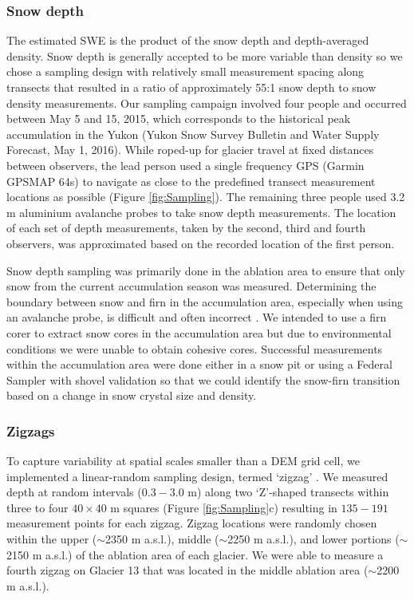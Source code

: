 \documentclass[review,oneside, letterpaper]{igs}
\begin{document}
\subsubsection{Snow depth}

The estimated SWE is the product of the snow depth and depth-averaged density. Snow depth is generally accepted to be more variable than density \citep{Elder1991, Clark2011, Lopez2013} so we chose a sampling design with relatively small measurement spacing along transects that resulted in a ratio of approximately 55:1 snow depth to snow density measurements. Our sampling campaign involved four people and occurred between May 5 and 15, 2015, which corresponds to the historical peak accumulation in the Yukon (Yukon Snow Survey Bulletin and Water Supply Forecast, May 1, 2016). While roped-up for glacier travel at fixed distances between observers, the lead person used a single frequency GPS (Garmin GPSMAP 64s) to navigate as close to the predefined transect measurement locations as possible (Figure \ref{fig:Sampling}). The remaining three people used 3.2 m aluminium avalanche probes to take snow depth measurements. The location of each set of depth measurements, taken by the second, third and fourth observers, was approximated based on the recorded location of the first person. 

Snow depth sampling was primarily done in the ablation area to ensure that only snow from the current accumulation season was measured. Determining the boundary between snow and firn in the accumulation area, especially when using an avalanche probe, is difficult and often incorrect \citep{Grunewald2010,Sold2013}. We intended to use a firn corer to extract snow cores in the accumulation area but due to environmental conditions we were unable to obtain cohesive cores. Successful measurements within the accumulation area were done either in a snow pit or using a Federal Sampler with shovel validation so that we could identify the snow-firn transition based on a change in snow crystal size and density. 

\subsubsection{Zigzags}

To capture variability at spatial scales smaller than a DEM grid cell, we implemented a linear-random sampling design, termed `zigzag' \citep{Shea2010}. We measured depth at random intervals ($0.3 - 3.0$ m) along two `Z'-shaped transects within three to four $40\times40$ m squares (Figure \ref{fig:Sampling}c) resulting in $135-191$ measurement points for each zigzag. Zigzag locations were randomly chosen within the upper ($\sim$2350 m a.s.l.), middle ($\sim$2250 m a.s.l.), and lower portions ($\sim$2150 m a.s.l.) of the ablation area of each glacier. We were able to measure a fourth zigzag on Glacier 13 that was located in the middle ablation area ($\sim$2200 m a.s.l.).
\end{document}

